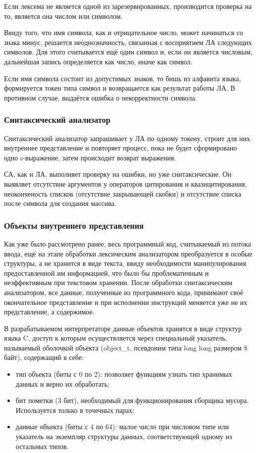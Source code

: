 Если лексема не является одной из зарезервированных, производится проверка на то, является она числом или символом.

Ввиду того, что имя символа, как и отрицательное число, может начинаться со знака минус, решается неоднозначность, связанная с восприятием ЛА следующих символов. Для этого считывается ещё один символ и, если он является числовым, дальнейшая запись определяется как число, иначе как символ.

Если имя символа состоит из допустимых знаков, то бишь из алфавита языка, формируется токен типа символ и возвращается как результат работы ЛА. В противном случае, выдаётся ошибка о некорректности символа.

\subsubsection{Синтаксический анализатор}
Синтаксический анализатор запрашивает у ЛА по одному токену, строит для них внутреннее представление и повторяет процесс, пока не будет сформировано одно s-выражение, затем происходит возврат выражения.

СА, как и ЛА, выполняет проверку на ошибки, но уже синтаксические. Он выявляет отсутствие аргументов у операторов цитирования и квазицитирования, неоконченость списков (отсутствие закрывающей скобки) и отсутствие списка после символа \quotes{\#} для создания массива.


\subsubsection{Объекты внутреннего представления}
Как уже было рассмотрено ранее, весь программный код, считываемый из потока ввода, ещё на этапе обработки лексическим анализатором преобразуется в особые структуры, а не хранится в виде текста, ввиду необходимости манипулирования предоставленной им информацией, что было бы проблематичным и неэффективным при текстовом хранении. После обработки синтаксическим анализатором, все данные, полученные из программного кода, принимают своё окончательное представление и при исполнении инструкций меняется уже не их представление, а содержимое.

В разрабатываемом интерпретаторе данные объектов хранятся в виде структур языка C, доступ к которым осуществляется через специальный указатель, называемый оболочкой объекта (object\_t, псевдоним типа long long размером 8 байт), содержащий в себе:
\begin{itemize}
	\item тип объекта (биты с 0 по 2): позволяет функциям узнать тип хранимых данных и верно их обработать;
	\item бит пометки (3 бит), необходимый для функционирования сборщика мусора. Используется только в точечных парах;
	\item данные объекта (биты с 4 по 64): малое число при числовом типе или указатель на экземпляр структуры данных, соответствующей одному из остальных типов.
\end{itemize}

